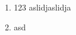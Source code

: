 \documentclass{article}
\begin{document}


\title{}
\begin{enumerate}
        \item 123
aslidjaslidja
        \item asd

\end{enumerate}
\end{document}
